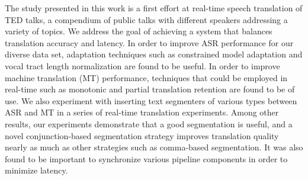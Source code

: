 The study presented in this work is a first effort at real-time speech translation of TED talks, a compendium of public talks with different speakers
 addressing a variety of topics.  We address the goal of achieving a system that
 balances translation accuracy and latency.  In order to improve ASR performance
 for our diverse data set, adaptation techniques such as constrained model
 adaptation and vocal tract length normalization are found to be useful.  In
 order to improve machine translation (MT) performance, techniques that could be
 employed in real-time such as monotonic and partial translation retention are
 found to be of use.  We also experiment with inserting text segmenters of
 various types between ASR and MT in a series of real-time translation
 experiments.  Among other results, our experiments demonstrate that a good
 segmentation is useful, and a novel conjunction-based segmentation strategy
 improves translation quality nearly as much as other strategies such as
 comma-based segmentation.  It was also found to be important to synchronize
 various pipeline components in order to minimize latency.

